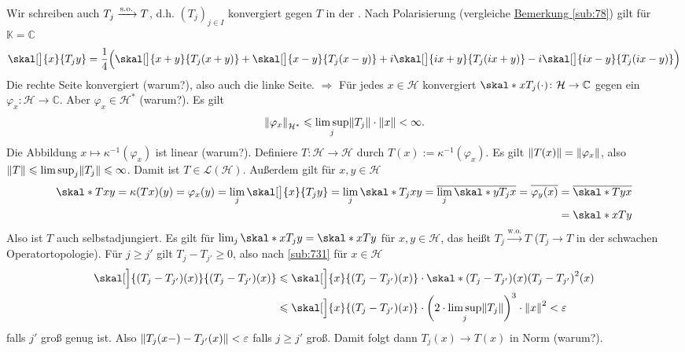 \noindent Wir schreiben auch $T_j \xrightarrow{\mathrm{s.o.}} T$, d.h. $(T_j)_{j \in I}$ konvergiert gegen $T$ in der .
Nach Polarisierung (vergleiche \hyperref[sub:78]{Bemerkung \ref*{sub:78}}) gilt für $\mathds{K}=\mathds{C}$ 
\[
	\skal[\big]{x}{T_j y} = \frac{1}{4} \enbrace[\Big]{\skal[\big]{x+y}{T_j(x+y)} + \skal[\big]{x-y}{T_j(x-y)} + i \skal[\big]{i x +y}{T_j(ix +y)} 
	- i \skal[\big]{i x -y}{T_j(ix-y)}}
\]
Die rechte Seite konvergiert (warum?), also auch die linke Seite. $\Rightarrow$ Für jedes $x \in \mathcal{H}$ konvergiert 
$\skal*{x}{T_j(\cdot)} \colon \mathcal{H} \to \mathds{C}$ gegen ein $\varphi_x \colon \mathcal{H} \to \mathds{C}$. Aber $\varphi_x \in \mathcal{H}^*$ (warum?). Es gilt
\begin{equation*}
	\norm[\mathcal{H}^*]{\varphi_x} \le \limsup_j \norm{T_j} \cdot \norm{x} < \infty. 
\end{equation*}
Die Abbildung $x \mapsto \kappa ^{-1}(\varphi_x)$ ist linear (warum?). Definiere 
$T \colon \mathcal{H} \to \mathcal{H}$ durch $T(x) := \kappa ^{-1}(\varphi_x)$. Es gilt $\norm{T(x)} = \norm{\varphi_x}$, also $\norm{T}\le\limsup_j \norm{T_j} \le \infty$.
Damit ist $T \in \mathcal{L}(\mathcal{H})$. Außerdem gilt für $x,y \in \mathcal{H}$
\begin{align*}
	\skal*{T x}{y} = \kappa(T x)(y) = \varphi_x(y) = \lim_j \skal[\big]{x}{T_j y} = \lim_j \skal*{T_j x}{y} = \overline{\lim_j \skal*{y}{T_j x}} 
	= \overline{\varphi_y(x)} &= \overline{\skal*{T y}{x}}\\  &= \skal*{x}{T y}  
\end{align*}
Also ist $T$ auch selbstadjungiert. Es gilt für $\lim_j \skal*{x}{T_j y} = \skal*{x}{T y}$ für $x,y \in \mathcal{H}$, das heißt $T_j \xrightarrow{\mathrm{w.o.}} T$
($T_j \to T$ in der schwachen Operatortopologie). Für $j \ge j'$ gilt $T_j - T_{j'} \ge 0$, also nach \ref{sub:731} für $x \in \mathcal{H}$
\begin{align*}
	\skal[\Big]{\enbrace*{T_j - T_{j'}}(x)}{\enbrace*{T_j - T_{j'}}(x)} &\le \skal[\Big]{x}{\enbrace*{T_j - T_{j'}}(x) } \cdot 
	\skal*{\enbrace*{T_j - T_{j'}}(x)}{\enbrace*{T_j - T_{j'}}^2(x) } \\
	&\le \skal[\Big]{x}{\enbrace*{T_j - T_{j'}}(x)} \cdot \enbrace*{2 \cdot \limsup_j \norm{T_j} }^3 \cdot \norm{x}^2 <  \varepsilon
\end{align*}
falls $j'$ groß genug ist. Also $\norm{T_j(x-)- T_{j'}(x)}< \varepsilon$ falls $j \ge j'$ groß. Damit folgt dann $T_j(x) \to T(x)$ in Norm (warum?). \bewende
\newpage

